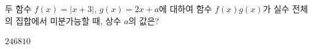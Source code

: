 두 함수 $f(x)=|x+3|$, $g(x)=2x+a$에 대하여 함수 $f(x)g(x)$가 실수 전체의 집합에서 미분가능할 때, 상수 $a$의 값은?
\begin{choices32}{$2$}{$4$}{$6$}{$8$}{$10$}\end{choices32}
